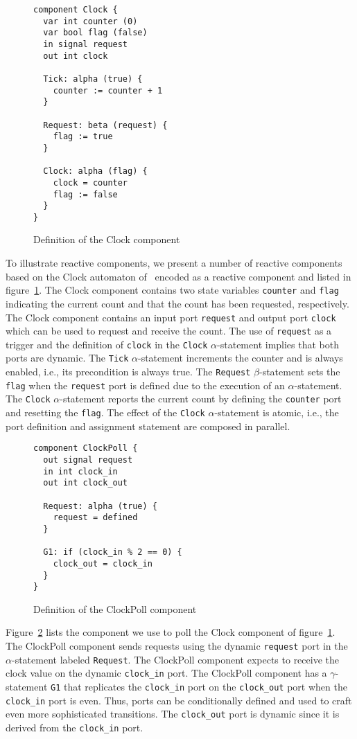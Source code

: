 \begin{figure}
\begin{verbatim}
component Clock {
  var int counter (0)
  var bool flag (false)
  in signal request
  out int clock

  Tick: alpha (true) {
    counter := counter + 1
  }

  Request: beta (request) {
    flag := true
  }

  Clock: alpha (flag) {
    clock = counter
    flag := false
  }
}
\end{verbatim}
\caption{Definition of the Clock component\label{clock_component}}
\end{figure}

To illustrate reactive components, we present a number of reactive components based on the Clock automaton of~\cite{nancy1996distributed} encoded as a reactive component and listed in figure~\ref{clock_component}.
The Clock component contains two state variables \verb+counter+ and \verb+flag+ indicating the current count and that the count has been requested, respectively.
The Clock component contains an input port \verb+request+ and output port \verb+clock+ which can be used to request and receive the count.
The use of \verb+request+ as a trigger and the definition of \verb+clock+ in the \verb+Clock+ $\alpha$-statement implies that both ports are dynamic.
The \verb+Tick+ $\alpha$-statement increments the counter and is always enabled, i.e., its precondition is always true.
The \verb+Request+ $\beta$-statement sets the \verb+flag+ when the \verb+request+ port is defined due to the execution of an $\alpha$-statement.
The \verb+Clock+ $\alpha$-statement reports the current count by defining the \verb+counter+ port and resetting the \verb+flag+.
The effect of the \verb+Clock+ $\alpha$-statement is atomic, i.e., the port definition and assignment statement are composed in parallel.

\begin{figure}
\begin{verbatim}
component ClockPoll {
  out signal request
  in int clock_in
  out int clock_out

  Request: alpha (true) {
    request = defined
  }

  G1: if (clock_in % 2 == 0) {
    clock_out = clock_in
  }
}
\end{verbatim}
\caption{Definition of the ClockPoll component\label{clock_poll_component}}
\end{figure}

Figure~\ref{clock_poll_component} lists the component we use to poll the Clock component of figure~\ref{clock_component}.
The ClockPoll component sends requests using the dynamic \verb+request+ port in the $\alpha$-statement labeled \verb+Request+.
The ClockPoll component expects to receive the clock value on the dynamic \verb+clock_in+ port.
The ClockPoll component has a $\gamma$-statement \verb+G1+ that replicates the \verb+clock_in+ port on the \verb+clock_out+ port when the \verb+clock_in+ port is even.
Thus, ports can be conditionally defined and used to craft even more sophisticated transitions.
The \verb+clock_out+ port is dynamic since it is derived from the \verb+clock_in+ port.

